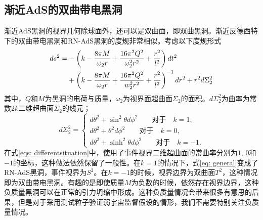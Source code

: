 \subsection{渐近AdS的双曲带电黑洞}
渐近AdS黑洞的视界几何除球面外，还可以是双曲面，即双曲黑洞。渐近反德西特下的双曲带电黑洞和RN-AdS黑洞的度规非常相似。考虑以下度规形式\citep{cai1999topological}
\begin{align}\label{eq: general}
    ds^2=&-\left(k-\frac{8\pi M}{\omega_2 r}+\frac{16 \pi^2 Q^2}{\omega_2^2r^2}+\frac{r^2}{l^2}\right)dt^2 \notag \\
    &+\left(k-\frac{8\pi M}{\omega_2 r}+\frac{16\pi^2 Q^2}{w_2^2 r^2}+\frac{r^2}{l^2}\right)^{-1}dr^2+r^2d\Sigma_2^2
\end{align}
其中，$Q$和$M$为黑洞的电荷与质量，$\omega_2$为视界面超曲面$\Sigma_2$的面积。$d\Sigma_2^2$为曲率为常数$2k$二维超曲面$\Sigma_2$的线元；
\begin{equation}\label{eqs: differentsituation}
    d\Sigma^2_2=\begin{cases}
        d\theta^2+\sin ^2 \theta d\phi^2 \qquad \text{对于} \quad k=1, \\
        d\theta^2+ \theta^2 d\phi^2 \qquad \text{对于} \quad k=0, \\
        d\theta^2+\sinh ^2 \theta d\phi^2 \qquad \text{对于} \quad k=-1.
    \end{cases}
\end{equation}
在式\eqref{eqs: differentsituation}中，使用了事件视界二维超曲面的常曲率分别为$1$, $0$和$-1$的坐标，这种做法依然保留了一般性。在$k=1$的情况下，式\eqref{eq: general}变成了RN-AdS黑洞，事件视界为$S^2$。在$k=-1$的时候，视界边界为双曲面$T^2$，这种情况即为双曲带电黑洞。有趣的是即使质量$M$为负数的时候，依然存在视界边界，这种负质量黑洞可以在正常的引力坍缩中形成\citep{mann1997black,smith1997formation}。这种负质量情况会带来很多有意思的后果，但是对于采用测试粒子验证弱宇宙监督假设的情形，我们不需要特别关注负质量情况。

